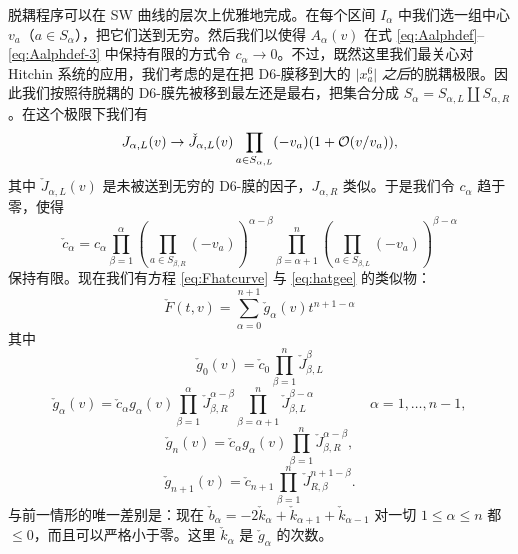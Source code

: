 脱耦程序可以在 SW 曲线的层次上优雅地完成。在每个区间 $I_\alpha$ 中我们选一组中心 $v_a$（$a\in S_\alpha$），把它们送到无穷。然后我们以使得 $A_\alpha(v)$ 在式 \eqref{eq:Aalphdef}–\eqref{eq:Aalphdef-3} 中保持有限的方式令 $c_\alpha \to 0$。不过，既然这里我们最关心对 Hitchin 系统的应用，我们考虑的是在把 D6-膜移到大的 $\vert x_a^6\vert$ \emph{之后}的脱耦极限。因此我们按照待脱耦的 D6-膜先被移到最左还是最右，把集合分成 $S_\alpha = S_{\alpha,L} \amalg S_{\alpha,R}$。在这个极限下我们有
\begin{equation}\label{eq:ch05-JLlimit}
J_{\alpha,L}(v) \to \check J_{\alpha,L}(v) \prod_{a\in S_{\alpha,L}} (-v_a) (1 +
\mathcal{O}(v/v_a)),
\end{equation}
其中 $\check J_{\alpha,L}(v)$ 是未被送到无穷的 D6-膜的因子，$J_{\alpha,R}$ 类似。于是我们令 $c_\alpha$ 趋于零，使得
\begin{equation}\label{eq:ch05-cctilde}
\check c_{\alpha} = c_\alpha \prod_{\beta=1}^\alpha \left( \prod_{a\in
S_{\beta,R}}(-v_a)\right)^{\alpha -\beta}\prod_{\beta=\alpha+1}^n \left( \prod_{a\in
S_{\beta,L}}(-v_a)\right)^{\beta -\alpha}
\end{equation}
保持有限。现在我们有方程 \eqref{eq:Fhatcurve} 与 \eqref{eq:hatgee} 的类似物：
\begin{equation}\label{eq:Fhatcurvechck}
\check F(t,v) = \sum_{\alpha=0}^{n+1} \check g_{\alpha}(v) t^{n+1-\alpha}
\end{equation}
其中
\begin{equation}\label{eq:hatgeechck}
\check g_0(v) = \check c_0 \prod_{\beta=1}^n \check J_{\beta,L}^\beta
\end{equation}
\begin{equation}\label{eq:hatgeechck-2}
\check g_{\alpha}(v) = \check c_{\alpha} g_{\alpha}(v) \prod_{\beta=1}^{\alpha} \check J_{
\beta,R}^{\alpha-\beta} \prod_{\beta=\alpha+1}^{n} \check
J_{\beta,L}^{\beta-\alpha}\qquad\qquad \alpha =1, \dots, n-1,
\end{equation}
\begin{equation}\label{eq:hatgeechck-3}
\check g_{n}(v) = \check c_{\alpha} g_{\alpha}(v) \prod_{\beta=1}^{n} \check J_{
\beta,R}^{\alpha-\beta},
\end{equation}
\begin{equation}\label{eq:hatgeechck-4}
\check g_{n+1}(v)  =  \check c_{n+1} \prod_{\beta=1}^{n} \check
J_{R,\beta}^{n+1-\beta}.
\end{equation}
与前一情形的唯一差别是：现在 $\check b_\alpha = -2\check k_\alpha + \check k_{\alpha + 1} + \check k_{\alpha -1}$ 对一切 $1\leq \alpha \leq n$ 都 $\leq 0$，而且可以严格小于零。这里 $\check k_\alpha$ 是 $\check g_{\alpha}$ 的次数。

